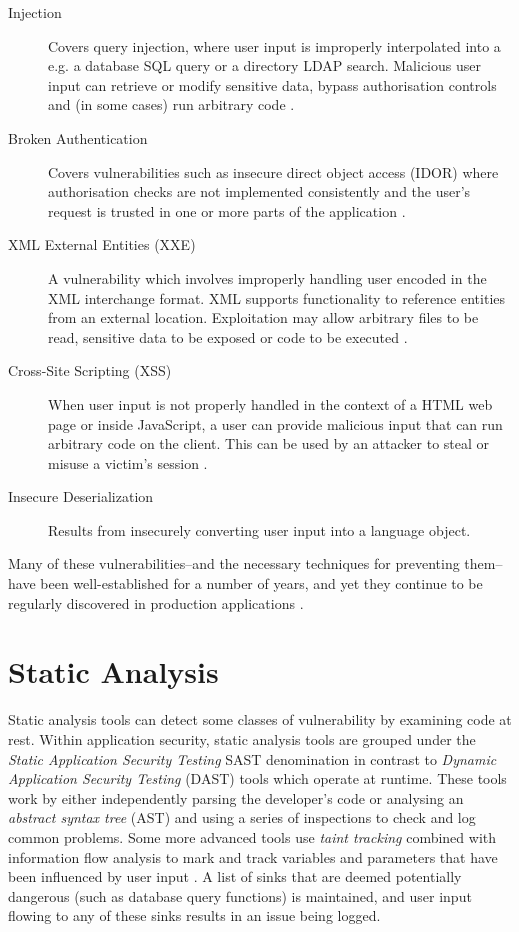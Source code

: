 \documentclass[a4paper,openany,12pt]{book}
\begin{document}
\begin{description}
	\item[Injection] Covers query injection, where user input is improperly interpolated into a e.g. a database SQL query or a directory LDAP search. Malicious user input can retrieve or modify sensitive data, bypass authorisation controls and (in some cases) run arbitrary code \citep[p.~291]{stuttard2011web}.
	\item[Broken Authentication] Covers vulnerabilities such as insecure direct object access (IDOR) where authorisation checks are not implemented consistently and the user's request is trusted in one or more parts of the application \citep[p.~257]{stuttard2011web}.
	\item[XML External Entities (XXE)] A vulnerability which involves improperly handling user encoded in the XML interchange format. XML supports functionality to reference entities from an external location. Exploitation may allow arbitrary files to be read, sensitive data to be exposed or code to be executed  \citep[p.~384]{stuttard2011web}.
	\item[Cross-Site Scripting (XSS)] When user input is not properly handled in the context of a HTML web page or inside JavaScript, a user can provide malicious input that can run arbitrary code on the client. This can be used by an attacker to steal or misuse a victim's session \citep[p.~431]{stuttard2011web}.
	\item[Insecure Deserialization] Results from insecurely converting user input into a language object.
\end{description}

Many of these vulnerabilities--and the necessary techniques for preventing them--have been well-established for a number of years, and yet they continue to be regularly discovered in production applications \citep[p.~2]{schneier2011secrets}.

\section{Static Analysis}

Static analysis tools can detect some classes of vulnerability by examining code at rest. Within application security, static analysis tools are grouped under the \emph{Static Application Security Testing} SAST denomination in contrast to \emph{Dynamic Application Security Testing} (DAST) tools which operate at runtime. These tools work by either independently parsing the developer's code or analysing an \emph{abstract syntax tree} (AST) and using a series of inspections to check and log common problems. Some more advanced tools use \emph{taint tracking} combined with information flow analysis to mark and track variables and parameters that have been influenced by user input \citep{denning1977certification}. A list of sinks that are deemed potentially dangerous (such as database query functions) is maintained, and user input flowing to any of these sinks results in an issue being logged.
\end{document}
